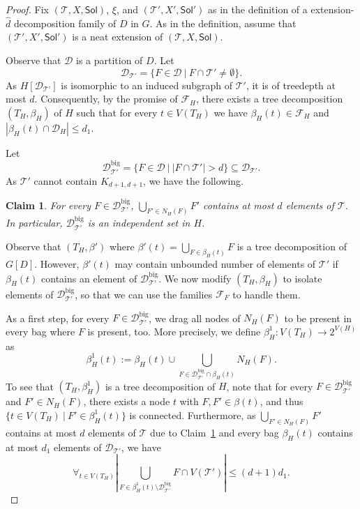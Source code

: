 \documentclass[11pt,a4paper]{article}
\newtheorem{claim}[theorem]{Claim}
\theoremstyle{definition}
\def\T{\mathcal{T}}
\def\Sol{\mathsf{Sol}}
\begin{document}
\begin{proof}
Fix $(\T,X,\Sol)$, $\xi$, and $(\T',X',\Sol')$ as in the definition of
a extension-$\widehat{d}$ decomposition family of $D$ in $G$.
As in the definition, assume that $(\T',X',\Sol')$ is a neat extension
of $(\T,X,\Sol)$. 

Observe that $\mathcal{D}$ is a partition of $D$.  
Let 
\[\mathcal{D}_{\T'} = \{F \in \mathcal{D}~|~ F \cap \T' \neq \emptyset\} .\]
As $H[\mathcal{D}_{\T'}]$ is isomorphic to an induced subgraph of $\T'$, it is of treedepth at most $d$. 
Consequently, by the promise of $\mathcal{F}_H$, there exists a tree decomposition $(T_H,\beta_H)$ of $H$
such that for every $t \in V(T_H)$ we have $\beta_H(t) \in \mathcal{F}_H$ and $|\beta_H(t) \cap \mathcal{D}_H| \leq d_1$. 

Let 
\[ \mathcal{D}^\mathrm{big}_{\T'} = \{F \in \mathcal{D}~|~|F \cap \T'| > d\} \subseteq \mathcal{D}_{\T'}. \]
As $\T'$ cannot contain $K_{d+1,d+1}$, we have the following.
\begin{claim}\label{cl:handle-bip:big}
For every $F \in \mathcal{D}^\mathrm{big}_{\T'}$, $\bigcup_{F' \in N_H(F)} F'$ contains at most $d$ elements of $\T$.
In particular, $\mathcal{D}^\mathrm{big}_{\T'}$ is an independent set in $H$.
\end{claim}

Observe that $(T_H,\beta')$ where $\beta'(t) = \bigcup_{F \in \beta_H(t)} F$ is a tree decomposition of $G[D]$.
However, $\beta'(t)$ may contain unbounded number of elements of $\T'$ if $\beta_H(t)$ contains an element of $\mathcal{D}^\mathrm{big}_{\T'}$.
We now modify $(T_H,\beta_H)$ to isolate elements of $\mathcal{D}^\mathrm{big}_{\T'}$, so that we can use the families $\mathcal{F}_{F}$ to handle them. 

As a first step, for every $F \in \mathcal{D}^\mathrm{big}_{\T'}$,
we drag all nodes of $N_H(F)$ to be present in every bag where $F$ is present, too.
More precisely, we define $\beta_H^1 : V(T_H) \to 2^{V(H)}$ as
\[ \beta_H^1(t) := \beta_H(t) \cup \bigcup_{F \in \mathcal{D}^\mathrm{big}_{\T'} \cap \beta_H(t)} N_H(F). \]
To see that $(T_H,\beta_H^1)$ is a tree decomposition of $H$, note that for every $F \in \mathcal{D}^\mathrm{big}_{\T'}$ and
  $F' \in N_H(F)$, there exists a node $t$ with $F,F' \in \beta(t)$, and thus $\{t\in V(T_H)~|~F' \in \beta_H^1(t)\}$ is connected.
Furthermore, as $\bigcup_{F' \in N_H(F)} F'$ contains at most $d$ elements of $\T$ due to Claim~\ref{cl:handle-bip:big}
and every bag $\beta_H(t)$ contains at most $d_1$ elements of $\mathcal{D}_{\T'}$, we have
  \[ \forall_{t \in V(T_H)} \left|\bigcup_{F \in \beta_H^1(t) \setminus \mathcal{D}^\mathrm{big}_{\T'}} F \cap V(\T')\right| \leq  (d+1)d_1. \]


\end{proof}
\end{document}
